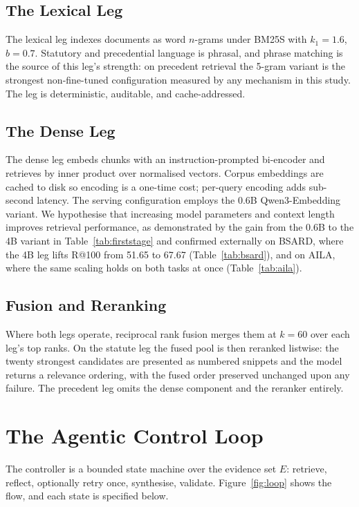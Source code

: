 \documentclass{mnnit}
\begin{document}
\subsection{The Lexical Leg}
The lexical leg indexes documents as word $n$-grams under BM25S
with $k_1=1.6$, $b=0.7$. Statutory and precedential language is
phrasal, and phrase matching is the source of this leg's
strength: on precedent retrieval the 5-gram variant is the
strongest non-fine-tuned configuration measured by any mechanism
in this study. The leg is deterministic, auditable, and
cache-addressed.

\subsection{The Dense Leg}
The dense leg embeds chunks with an instruction-prompted
bi-encoder and retrieves by inner product over normalised
vectors. Corpus embeddings are cached to disk so encoding is a
one-time cost; per-query encoding adds sub-second latency. The
serving configuration employs the 0.6B Qwen3-Embedding variant.
We hypothesise that increasing model parameters and context
length improves retrieval performance, as demonstrated by the
gain from the 0.6B to the 4B variant in
Table~\ref{tab:firststage} and confirmed externally on BSARD,
where the 4B leg lifts R@100 from 51.65 to 67.67
(Table~\ref{tab:bsard}), and on AILA, where the same scaling
holds on both tasks at once (Table~\ref{tab:aila}).

\subsection{Fusion and Reranking}
Where both legs operate, reciprocal rank fusion merges them at
$k=60$ over each leg's top ranks. On the statute leg the fused
pool is then reranked listwise: the twenty strongest candidates
are presented as numbered snippets and the model returns a
relevance ordering, with the fused order preserved unchanged upon
any failure. The precedent leg omits the dense component and the
reranker entirely.

\section{The Agentic Control Loop}
The controller is a bounded state machine over the evidence set
$E$: retrieve, reflect, optionally retry once, synthesise,
validate. Figure~\ref{fig:loop} shows the flow, and each state is
specified below.
\end{document}
